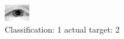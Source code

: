 \begin{figure}[h!]
\begin{center}
\includegraphics[width=0.60\columnwidth]{figures/ID2359_class_1_target_2.png}
\end{center}
\caption{ Classification: 1 actual target: 2}
\label{fig:ID2359_class_1_target_2}
\end{figure}
